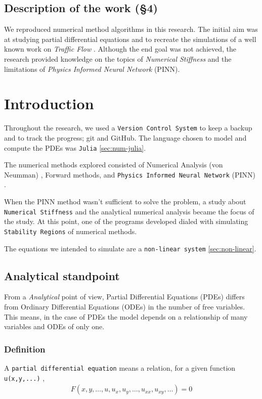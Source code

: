 \documentclass[11pt]{article}
\begin{document}
\subsection{Description of the work (§4)}
\label{sec:org4e255dc}

We reproduced numerical method algorithms in this research. The initial
aim was at studying partial differential equations and to
recreate the simulations of a well known work on \emph{Traffic Flow}
\cite{kerner1993}. Although the end goal was not achieved, the
research provided knowledge on the topics of \emph{Numerical Stiffness} and
the limitations of \emph{Physics Informed Neural Network} (PINN).

\section{Introduction}
\label{sec:org56132cc}

Throughout the research, we used a \texttt{Version Control System} to keep a backup and
to track the progress; git and GitHub. The language chosen to model and compute
the PDEs was \texttt{Julia} \ref{sec:num-julia}.

The numerical methods explored consisted of Numerical
Analysis (von Neumman) \cite{press1986numerical}, Forward methods, and \texttt{Physics
Informed Neural Network} (PINN) \cite{zubov2021neuralpde}.

When the PINN method wasn't sufficient to solve the problem, a study about
\texttt{Numerical Stiffness} and the analytical numerical analysis became the focus of
the study. At this point, one of the programs developed dialed with simulating
\texttt{Stability Regions} of numerical methods.

The equations we intended to simulate are a \texttt{non-linear system} \ref{sec:non-linear}.

\subsection{Analytical standpoint}
\label{sec:org8baa5ab}
From a \emph{Analytical} point of view, Partial Differential Equations
(PDEs) differs from Ordinary Differential Equations (ODEs) in the
number of free variables. This means, in the case of PDEs the model depends on a
relationship of many variables and ODEs of only one.

\subsubsection{Definition}
\label{sec:orgf5b985d}
A \texttt{partial differential equation} means a relation, for a given function
\texttt{u(x,y,...)} \cite{john1978partial},
\begin{equation}
\label{eq:PDE}
\begin{aligned}
F(x,y,\ldots ,u,u_{x}, u_{y}, \ldots, u_{xx}, u_{xy}, \ldots{})=0
\end{aligned}
\end{equation}
\end{document}
